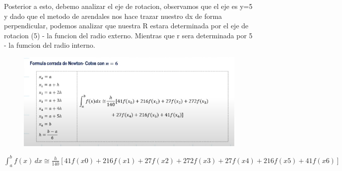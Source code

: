 \documentclass{article}
\theoremstyle{mytheoremstyle}
\theoremstyle{mytheoremstyle}
\theoremstyle{myproblemstyle}
\begin{document}
Posterior a esto, debemo analizar el eje de rotacion, observamos que el eje es y=5 y dado que el metodo de arendales nos hace trazar 
nuestro dx de forma perpendicular, podemos analizar que nuestra R estara determinada por el eje de rotacion (5) - la funcion del radio externo. Mientras que r
sera determinada por 5 - la fumcion del radio interno.
\begin{figure}[ht]
    \includegraphics[scale=0.8]{img/nc1_3.png}  
\end{figure}
\begin{theorem}[Formula cerrada de Newton-Cotes con n=6]
    $\int_{a}^{b} f(x) \,dx \cong \frac{h}{140}[41f(x0)+216f(x1)+27f(x2)+272f(x3)+27f(x4)+216f(x5)+41f(x6)]$
\end{theorem}
\end{document}

